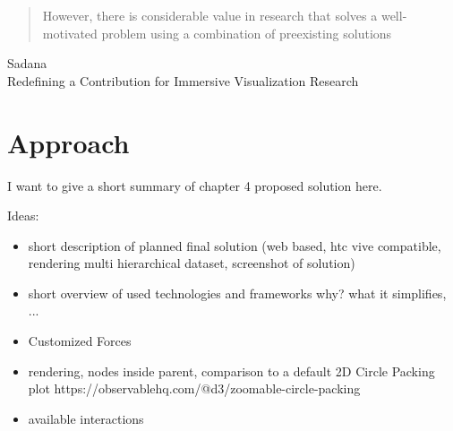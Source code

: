 \begin{quotation}
    However, there is considerable value in research that
    solves a well-motivated problem using a combination
    of preexisting solutions 
\end{quotation}
Sadana\\
Redefining a Contribution for Immersive Visualization Research\\

\section{Approach}



I want to give a short summary of chapter 4 proposed solution here. 

Ideas:
\begin{itemize}
    \item short description of planned final solution (web based, htc vive compatible, rendering multi hierarchical dataset, screenshot of solution)  
    \item short overview of used technologies and frameworks why? what it simplifies, ... 
    \item Customized Forces
    \item rendering, nodes inside parent, comparison to a default 2D Circle Packing plot https://observablehq.com/@d3/zoomable-circle-packing 
    \item available interactions
\end{itemize}